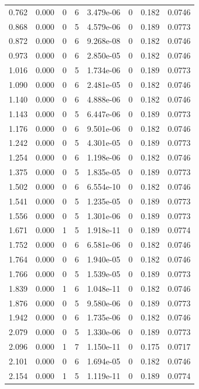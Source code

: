 \documentclass[preview]{standalone}
\begin{document}
{{\begin{tabular}{L{1.2cm}C{1.2cm} C{0.3cm}C{0.5cm} C{1.4cm}C{1.4cm} C{1.4cm}C{1.4cm}}
  0.762  &  0.000  & 0     &  6 &  3.479e-06  & 0  & 0.182 &  0.0746   \\ 
  0.868  &  0.000  & 0     &  5 &  4.579e-06  & 0  & 0.189 &  0.0773   \\ 
  0.872  &  0.000  & 0     &  6 &  9.268e-08  & 0  & 0.182 &  0.0746   \\ 
  0.973  &  0.000  & 0     &  6 &  2.850e-05  & 0  & 0.182 &  0.0746   \\ 
  1.016  &  0.000  & 0     &  5 &  1.734e-06  & 0  & 0.189 &  0.0773   \\ 
  1.090  &  0.000  & 0     &  6 &  2.481e-05  & 0  & 0.182 &  0.0746   \\ 
  1.140  &  0.000  & 0     &  6 &  4.888e-06  & 0  & 0.182 &  0.0746   \\ 
  1.143  &  0.000  & 0     &  5 &  6.447e-06  & 0  & 0.189 &  0.0773   \\ 
  1.176  &  0.000  & 0     &  6 &  9.501e-06  & 0  & 0.182 &  0.0746   \\ 
  1.242  &  0.000  & 0     &  5 &  4.301e-05  & 0  & 0.189 &  0.0773   \\ 
  1.254  &  0.000  & 0     &  6 &  1.198e-06  & 0  & 0.182 &  0.0746   \\ 
  1.375  &  0.000  & 0     &  5 &  1.835e-05  & 0  & 0.189 &  0.0773   \\ 
  1.502  &  0.000  & 0     &  6 &  6.554e-10  & 0  & 0.182 &  0.0746   \\ 
  1.541  &  0.000  & 0     &  5 &  1.235e-05  & 0  & 0.189 &  0.0773   \\ 
  1.556  &  0.000  & 0     &  5 &  1.301e-06  & 0  & 0.189 &  0.0773   \\ 
  1.671  &  0.000  & 1     &  5 &  1.918e-11  & 0  & 0.189 &  0.0774   \\ 
  1.752  &  0.000  & 0     &  6 &  6.581e-06  & 0  & 0.182 &  0.0746   \\ 
  1.764  &  0.000  & 0     &  6 &  1.940e-05  & 0  & 0.182 &  0.0746   \\ 
  1.766  &  0.000  & 0     &  5 &  1.539e-05  & 0  & 0.189 &  0.0773   \\ 
  1.839  &  0.000  & 1     &  6 &  1.048e-11  & 0  & 0.182 &  0.0746   \\ 
  1.876  &  0.000  & 0     &  5 &  9.580e-06  & 0  & 0.189 &  0.0773   \\ 
  1.942  &  0.000  & 0     &  6 &  1.735e-06  & 0  & 0.182 &  0.0746   \\ 
  2.079  &  0.000  & 0     &  5 &  1.330e-06  & 0  & 0.189 &  0.0773   \\ 
  2.096  &  0.000  & 1     &  7 &  1.150e-11  & 0  & 0.175 &  0.0717   \\ 
  2.101  &  0.000  & 0     &  6 &  1.694e-05  & 0  & 0.182 &  0.0746   \\ 
  2.154  &  0.000  & 1     &  5 &  1.119e-11  & 0  & 0.189 &  0.0774   \\ 
\hline 
\end{tabular} 

}}
\end{document}

